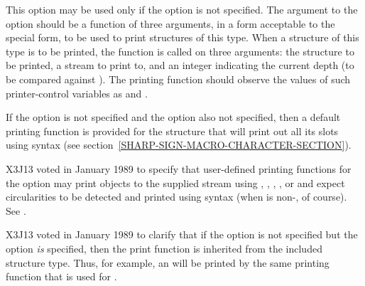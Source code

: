 \begin{flushdesc}
\item[\cd{:print-function}]
This option may be used only if the 
option is not specified.
The argument to the  option
should be a function of three arguments,
in a form acceptable to the  special form,
to be used to print structures of this type.
When a structure of this type is to be printed, the function
is called on three arguments:
the structure to be printed, a stream to print to,
and an integer indicating the current depth (to be compared against
).
The printing function should observe the values of
such printer-control variables as 
and .

If the  option is not specified and the 
option also not specified, then a default printing function is
provided for the structure that will print out all its slots
using  syntax (see section~\ref{SHARP-SIGN-MACRO-CHARACTER-SECTION}).

\begin{new}
X3J13 voted in January 1989
to specify that user-defined printing functions for the 
 option may print objects to the
supplied stream using , , , ,
or  and expect circularities to be detected and printed
using  syntax (when  is non-, of course).
See .
\end{new}


\begin{new}
X3J13 voted in January 1989
to clarify that if the 
option is not specified but the  option \emph{is} specified,
then the print function is inherited from the included structure type.
Thus, for example, an  will be printed by the same
printing function that is used for .


\end{new}
\end{flushdesc}
